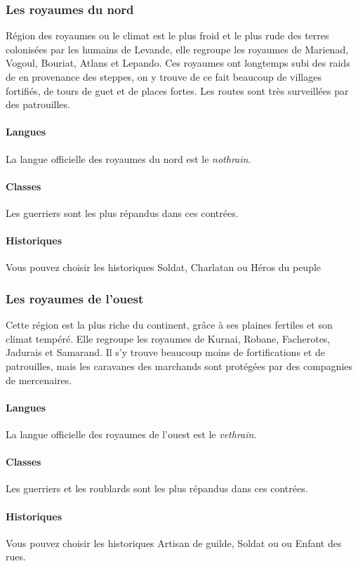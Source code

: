 \documentclass[a4paper,10pt,openany]{book}
\begin{document}
\begin{multicols}{2}
\subsubsection{Les royaumes du nord}
Région des royaumes ou le climat est le plus froid et le plus rude des terres colonisées par les humains de Levande, elle regroupe les royaumes de
Marienad, Vogoul, Bouriat, Atlans et Lepando. Ces royaumes ont longtemps subi des raids de \DemiOrcs en provenance des steppes, on y trouve de ce fait
beaucoup de villages fortifiés, de tours de guet et de places fortes. Les routes sont très surveillées par des patrouilles.
\paragraph{Langues}
La langue officielle des royaumes du nord est le \emph{nothrain}.
\paragraph{Classes}
Les guerriers sont les plus répandus dans ces contrées.
\paragraph{Historiques}
Vous pouvez choisir les historiques Soldat, Charlatan ou Héros du peuple

\subsubsection{Les royaumes de l’ouest}
Cette région est la plus riche du continent, grâce à ses plaines fertiles et son climat tempéré. Elle regroupe les royaumes de Kurnai, Robane,
Facherotes, Jadurais et Samarand. Il s’y trouve beaucoup moins de fortifications et de patrouilles, mais les caravanes des marchands sont protégées
par des compagnies de mercenaires.
\paragraph{Langues}
La langue officielle des royaumes de l’ouest est le \emph{vethrain}.
\paragraph{Classes}
Les guerriers et les roublards sont les plus répandus dans ces contrées.
\paragraph{Historiques}
Vous pouvez choisir les historiques Artisan de guilde, Soldat ou ou Enfant des rues.


\end{multicols}
\end{document}
